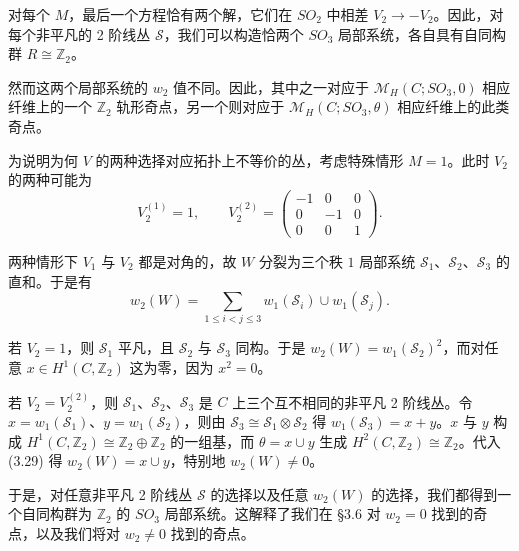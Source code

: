 \documentclass[11pt,a4paper]{article}
\begin{document}
对每个 $M$，最后一个方程恰有两个解，它们在 $SO_2$ 中相差 $V_2\to-V_2$。因此，对每个非平凡的 2 阶线丛 $\mathcal{S}$，我们可以构造恰两个 $SO_3$ 局部系统，各自具有自同构群 $R\cong\mathbb{Z}_2$。

然而这两个局部系统的 $w_2$ 值不同。因此，其中之一对应于 $\mathcal{M}_H(C;SO_3,0)$ 相应纤维上的一个 $\mathbb{Z}_2$ 轨形奇点，另一个则对应于 $\mathcal{M}_H(C;SO_3,\theta)$ 相应纤维上的此类奇点。

为说明为何 $V$ 的两种选择对应拓扑上不等价的丛，考虑特殊情形 $M=1$。此时 $V_2$ 的两种可能为
\begin{equation}\tag{3.28}
V_2^{(1)}=1,\qquad
V_2^{(2)}=
\begin{pmatrix}
-1 & 0 & 0\\
0 & -1 & 0\\
0 & 0 & 1
\end{pmatrix}.
\end{equation}


两种情形下 $V_1$ 与 $V_2$ 都是对角的，故 $W$ 分裂为三个秩 $1$ 局部系统 $\mathcal{S}_1$、$\mathcal{S}_2$、$\mathcal{S}_3$ 的直和。于是有
\begin{equation}\tag{3.29}
w_2(W)=\sum_{1\le i<j\le3}w_1(\mathcal{S}_i)\cup w_1(\mathcal{S}_j).
\end{equation}

若 $V_2=1$，则 $\mathcal{S}_1$ 平凡，且 $\mathcal{S}_2$ 与 $\mathcal{S}_3$ 同构。于是 $w_2(W)=w_1(\mathcal{S}_2)^2$，而对任意 $x\in H^1(C,\mathbb{Z}_2)$ 这为零，因为 $x^2=0$。

若 $V_2=V_2^{(2)}$，则 $\mathcal{S}_1$、$\mathcal{S}_2$、$\mathcal{S}_3$ 是 $C$ 上三个互不相同的非平凡 2 阶线丛。令 $x=w_1(\mathcal{S}_1)$、$y=w_1(\mathcal{S}_2)$，则由 $\mathcal{S}_3\cong\mathcal{S}_1\otimes\mathcal{S}_2$ 得 $w_1(\mathcal{S}_3)=x+y$。$x$ 与 $y$ 构成 $H^1(C,\mathbb{Z}_2)\cong\mathbb{Z}_2\oplus\mathbb{Z}_2$ 的一组基，而 $\theta=x\cup y$ 生成 $H^2(C,\mathbb{Z}_2)\cong\mathbb{Z}_2$。代入 (3.29) 得 $w_2(W)=x\cup y$，特别地 $w_2(W)\ne0$。

于是，对任意非平凡 2 阶线丛 $\mathcal{S}$ 的选择以及任意 $w_2(W)$ 的选择，我们都得到一个自同构群为 $\mathbb{Z}_2$ 的 $SO_3$ 局部系统。这解释了我们在 §3.6 对 $w_2=0$ 找到的奇点，以及我们将对 $w_2\ne0$ 找到的奇点。
\end{document}
